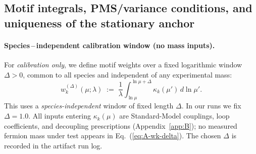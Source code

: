 \documentclass[aps,prd,onecolumn,amsmath,amssymb,superscriptaddress,nofootinbib,showpacs,showkeys]{revtex4-2}
\begin{document}

\subsection{ Motif integrals, PMS/variance conditions, and uniqueness of the stationary anchor}

\paragraph{Species\,–\,independent calibration window (no mass inputs).}
For \emph{calibration only}, we define motif weights over a fixed logarithmic window \(\Delta>0\), common to all species and independent of any experimental mass:
\begin{equation}
  w_k^{(\Delta)}(\mu;\lambda)
  \;:=\; \frac{1}{\lambda}\int_{\ln\mu}^{\ln\mu+\Delta}\!\kappa_k(\mu')\,d\ln\mu'.
  \label{eq:A-wk-delta}
\end{equation}
This uses a \emph{species-independent} window of fixed length \(\Delta\). In our runs we fix \(\Delta=1.0\). All inputs entering \(\kappa_k(\mu)\) are Standard-Model couplings, loop coefficients, and decoupling prescriptions (Appendix~\ref{app:B}); no measured fermion mass under test appears in Eq.~(\ref{eq:A-wk-delta}). The chosen \(\Delta\) is recorded in the artifact run log.
\end{document}
